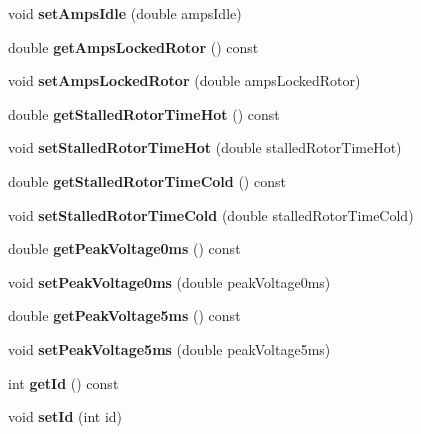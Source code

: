 \begin{DoxyCompactItemize}
void {\bfseries set\+Amps\+Idle} (double amps\+Idle)
\item 
\mbox{\label{class_motor_data_a22917cf90eadc0da1e966257600f5631}} 
double {\bfseries get\+Amps\+Locked\+Rotor} () const
\item 
\mbox{\label{class_motor_data_a65c396ebcd810ce77c5201c19fcfaa81}} 
void {\bfseries set\+Amps\+Locked\+Rotor} (double amps\+Locked\+Rotor)
\item 
\mbox{\label{class_motor_data_aede27e2ea96b57b0c11dd092801868c6}} 
double {\bfseries get\+Stalled\+Rotor\+Time\+Hot} () const
\item 
\mbox{\label{class_motor_data_a18cc65247e2e51cebe93faaceec44642}} 
void {\bfseries set\+Stalled\+Rotor\+Time\+Hot} (double stalled\+Rotor\+Time\+Hot)
\item 
\mbox{\label{class_motor_data_aa8ccd929fc9a25765440fb8b04e71a44}} 
double {\bfseries get\+Stalled\+Rotor\+Time\+Cold} () const
\item 
\mbox{\label{class_motor_data_ad52da7f0ac62233e71564023c22f6138}} 
void {\bfseries set\+Stalled\+Rotor\+Time\+Cold} (double stalled\+Rotor\+Time\+Cold)
\item 
\mbox{\label{class_motor_data_aef4147e64c402f7e89e295b050f302d3}} 
double {\bfseries get\+Peak\+Voltage0ms} () const
\item 
\mbox{\label{class_motor_data_ace2eb139ee2b7d070573ffd201853e41}} 
void {\bfseries set\+Peak\+Voltage0ms} (double peak\+Voltage0ms)
\item 
\mbox{\label{class_motor_data_a63cb35bd7064d68a989a84219b0f210a}} 
double {\bfseries get\+Peak\+Voltage5ms} () const
\item 
\mbox{\label{class_motor_data_a1556adb7bc4d3f92565e6fa3783e1d52}} 
void {\bfseries set\+Peak\+Voltage5ms} (double peak\+Voltage5ms)
\item 
\mbox{\label{class_motor_data_ac67a3f78e851968c9979e60cbf0f495b}} 
int {\bfseries get\+Id} () const
\item 
\mbox{\label{class_motor_data_ae26351f2cfd4e0acbd413b008ac2759f}} 
void {\bfseries set\+Id} (int id)
\end{DoxyCompactItemize}

